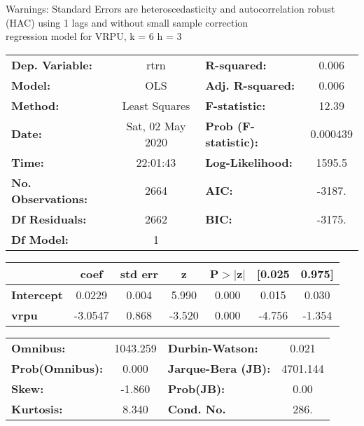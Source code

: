 Warnings: \newline
 [1] Standard Errors are heteroscedasticity and autocorrelation robust (HAC) using 1 lags and without small sample correction\\ 

regression model for VRPU, k = 6 h = 3\begin{center}
\begin{tabular}{lclc}
\toprule
\textbf{Dep. Variable:}    &       rtrn       & \textbf{  R-squared:         } &     0.006   \\
\textbf{Model:}            &       OLS        & \textbf{  Adj. R-squared:    } &     0.006   \\
\textbf{Method:}           &  Least Squares   & \textbf{  F-statistic:       } &     12.39   \\
\textbf{Date:}             & Sat, 02 May 2020 & \textbf{  Prob (F-statistic):} &  0.000439   \\
\textbf{Time:}             &     22:01:43     & \textbf{  Log-Likelihood:    } &    1595.5   \\
\textbf{No. Observations:} &        2664      & \textbf{  AIC:               } &    -3187.   \\
\textbf{Df Residuals:}     &        2662      & \textbf{  BIC:               } &    -3175.   \\
\textbf{Df Model:}         &           1      & \textbf{                     } &             \\
\bottomrule
\end{tabular}
\begin{tabular}{lcccccc}
                   & \textbf{coef} & \textbf{std err} & \textbf{z} & \textbf{P$> |$z$|$} & \textbf{[0.025} & \textbf{0.975]}  \\
\midrule
\textbf{Intercept} &       0.0229  &        0.004     &     5.990  &         0.000        &        0.015    &        0.030     \\
\textbf{vrpu}      &      -3.0547  &        0.868     &    -3.520  &         0.000        &       -4.756    &       -1.354     \\
\bottomrule
\end{tabular}
\begin{tabular}{lclc}
\textbf{Omnibus:}       & 1043.259 & \textbf{  Durbin-Watson:     } &    0.021  \\
\textbf{Prob(Omnibus):} &   0.000  & \textbf{  Jarque-Bera (JB):  } & 4701.144  \\
\textbf{Skew:}          &  -1.860  & \textbf{  Prob(JB):          } &     0.00  \\
\textbf{Kurtosis:}      &   8.340  & \textbf{  Cond. No.          } &     286.  \\
\bottomrule
\end{tabular}
\end{center}

